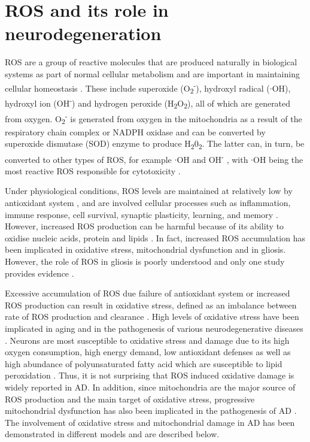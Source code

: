 \section{ROS and its role in neurodegeneration}
ROS are a group of reactive molecules that are produced naturally in biological systems as part of normal cellular metabolism and are important in maintaining cellular homeostasis \citep{Cenini2019}. These include superoxide (O\textsubscript{2}\textsuperscript{-}), hydroxyl radical ($\cdot$OH), hydroxyl ion (OH\textsuperscript{-}) and hydrogen peroxide (H\textsubscript{2}O\textsubscript{2}), all of which are generated from oxygen. O\textsubscript{2}\textsuperscript{-} is generated from oxygen in the mitochondria as a result of the respiratory chain complex or NADPH oxidase and can be converted by superoxide dismutase (SOD) enzyme to produce H\textsubscript{2}0\textsubscript{2}. The latter can, in turn, be converted to other types of ROS, for example $\cdot$OH and OH\textsuperscript{-} \citep{Kim2015a}, with $\cdot$OH being the most reactive ROS responsible for cytotoxicity \citep{Bolisetty2013}.

Under physiological conditions, ROS levels are maintained at relatively low by antioxidant system \citep{Dasuri2013,Gandhi2012}, and are involved cellular processes such as inflammation, immune response, cell survival, synaptic plasticity, learning, and memory \citep{Cenini2019,Kishida2007,Liu2017}. However, increased ROS production can be harmful because of its ability to oxidise nucleic acids, protein and lipids \citep{Wang2014}. In fact, increased ROS accumulation has been implicated in oxidative stress, mitochondrial dysfunction and in gliosis. However, the role of ROS in gliosis is poorly understood and only one study provides evidence \citep{Kishida2007}.

Excessive accumulation of ROS due failure of antioxidant system or increased ROS production can result in oxidative stress, defined as an imbalance between rate of ROS production and clearance \citep{Wang2014}. High levels of oxidative stress have been implicated in aging and in the pathogenesis of various neurodegenerative diseases \citep{Bonda2010,Cenini2019,Liu2017,Shibata2008}. Neurons are most susceptible to oxidative stress and damage due to its high oxygen consumption, high energy demand, low antioxidant defenses as well as high abundance of polyunsaturated fatty acid which are susceptible to lipid peroxidation \citep{Cobley2018}. Thus, it is not surprising that ROS induced oxidative damage is widely reported in AD. In addition, since mitochondria are the major source of ROS production and the main target of oxidative stress, progressive mitochondrial dysfunction has also been implicated in the pathogenesis of AD \citep{Swerdlow2007}. The involvement of oxidative stress and mitochondrial damage in AD has been demonstrated in different models and are described below. 

